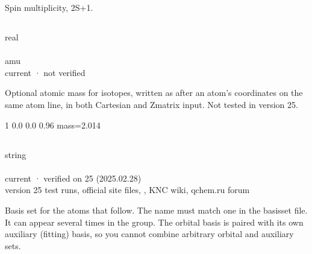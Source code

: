 \documentclass[letterpaper,10pt,english,openany,oneside]{sphinxmanual}
\begin{document}
\sphinxAtStartPar
Spin multiplicity, 2S+1.


\subsection{}
\label{\detokenize{reference/molecule:mass}}\label{\detokenize{reference/molecule:molecule-mass}}
\ignorespaces 
\sphinxAtStartPar
{} real\\
 \\
 amu\\
 current · not verified\\
 

\sphinxAtStartPar
Optional atomic mass for isotopes, written as  after an atom’s coordinates on the same atom line, in
both Cartesian and Z\sphinxhyphen{}matrix input. Not tested in version 25.

\sphinxAtStartPar
{}

\begin{sphinxVerbatim}[commandchars=\\\{\}]
1  0.0  0.0  0.96  mass=2.014
\end{sphinxVerbatim}


\subsection{}
\label{\detokenize{reference/molecule:set}}\label{\detokenize{reference/molecule:molecule-set}}
\ignorespaces 
\sphinxAtStartPar
{} string\\
 \\
 current · verified on 25 (2025.02.28)\\
 version 25 test runs, official site files, , KNC wiki, qchem.ru forum

\sphinxAtStartPar
Basis set for the atoms that follow. The name must match one in the basis\sphinxhyphen{}set file. It can appear several
times in the group. The orbital basis is paired with its own auxiliary (fitting) basis, so you cannot
combine arbitrary orbital and auxiliary sets.
\end{document}
